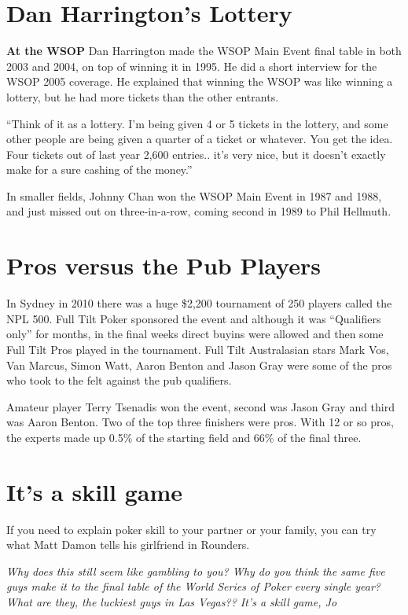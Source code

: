 \section{Dan Harrington's Lottery}

\textbf{At the WSOP} Dan Harrington made the WSOP Main Event final
table in both 2003 and 2004, on top of winning it in 1995. He
did a short interview for the WSOP 2005 coverage. He explained that
winning the WSOP was like winning a lottery, but he had more tickets
than the other entrants.

``Think of it as a lottery. I'm being given 4 or 5 tickets in the
lottery, and some other people are being given a quarter of a ticket
or whatever. You get the idea. Four tickets out of last year 2,600
entries.. it's very nice, but it doesn't exactly make for a sure
cashing of the money.''

In smaller fields, Johnny Chan won the WSOP Main Event in 1987 and
1988, and just missed out on three-in-a-row, coming second in 1989 to
Phil Hellmuth.

\section{Pros versus the Pub Players}

In Sydney in 2010 there was a huge \$2,200 tournament of 250 players
called the NPL 500. Full Tilt Poker sponsored the event and although
it was ``Qualifiers only'' for months, in the final weeks direct
buyins were allowed and then some Full Tilt Pros played in the
tournament.  Full Tilt Australasian stars Mark Vos, Van Marcus, Simon
Watt, Aaron Benton and Jason Gray were some of the pros who took to
the felt against the pub qualifiers.

Amateur player Terry Tsenadis won the event, second was Jason Gray and
third was Aaron Benton. Two of the top three finishers were pros. With
12 or so pros, the experts made up 0.5\% of the starting field and
66\% of the final three.

\section{It's a skill game}

If you need to explain poker skill to your partner or your family, you
can try what Matt Damon tells his girlfriend in Rounders.

\textit{Why does this still seem like gambling to you? Why do you
  think the same five guys make it to the final table of the World
  Series of Poker every single year? What are they, the luckiest guys
  in Las Vegas?? It's a skill game, Jo}
